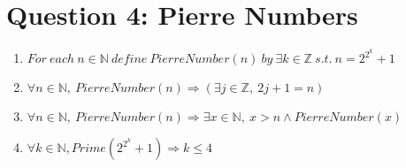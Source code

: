 \documentclass[12pt]{article}
\begin{document}
\section{Question 4: Pierre Numbers}
\begin{enumerate}[label=(\alph*)]
	\item $For\ each\ n \in \mathbb{N}\ define\ PierreNumber(n)\ by\ \exists k \in \mathbb{Z}\ s.t.\ n=2^{2^k} + 1$
	\item $\forall n \in \mathbb{N},\ PierreNumber(n)\Rightarrow (\exists j \in \mathbb{Z},\ 2j + 1 = n)$
	\item $\forall n \in \mathbb{N},\ PierreNumber(n) \Rightarrow \exists x \in \mathbb{N},\ x>n\wedge PierreNumber(x)$
	\item $\forall k \in \mathbb{N}, Prime(2^{2^k}+1)\Rightarrow k \leq 4$
\end{enumerate}
\end{document}
